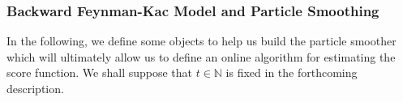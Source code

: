 \documentclass[english]{article}
\newtheorem{theorem}{Theorem}[section]
\begin{document}




\subsubsection{Backward Feynman-Kac Model and Particle Smoothing}


In the following, we define some objects to help us build the particle smoother which will ultimately allow us to define an online algorithm for estimating the score function.
We shall suppose that $t\in\mathbb{N}$ is fixed in the forthcoming description.
\end{document}
